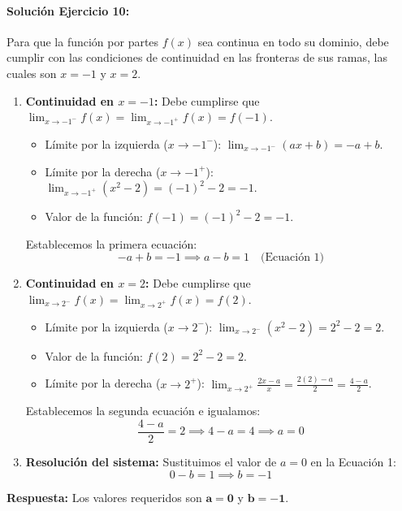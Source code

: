 \documentclass[11pt,letterpaper]{article}
\begin{document}
\paragraph{Solución Ejercicio 10:}
Para que la función por partes $f(x)$ sea continua en todo su dominio, debe cumplir con las condiciones de continuidad en las fronteras de sus ramas, las cuales son $x = -1$ y $x = 2$.
\begin{enumerate}
    \item \textbf{Continuidad en $x = -1$:} Debe cumplirse que $\lim_{x\to -1^-} f(x) = \lim_{x\to -1^+} f(x) = f(-1)$.
    \begin{itemize}
        \item Límite por la izquierda ($x \to -1^-$): $\lim_{x\to -1^-} (ax + b) = -a + b$.
        \item Límite por la derecha ($x \to -1^+$): $\lim_{x\to -1^+} (x^2 - 2) = (-1)^2 - 2 = -1$.
        \item Valor de la función: $f(-1) = (-1)^2 - 2 = -1$.
    \end{itemize}
    Establecemos la primera ecuación:
    $$-a + b = -1 \implies a - b = 1 \quad \text{(Ecuación 1)}$$
    
    \item \textbf{Continuidad en $x = 2$:} Debe cumplirse que $\lim_{x\to 2^-} f(x) = \lim_{x\to 2^+} f(x) = f(2)$.
    \begin{itemize}
        \item Límite por la izquierda ($x \to 2^-$): $\lim_{x\to 2^-} (x^2 - 2) = 2^2 - 2 = 2$.
        \item Valor de la función: $f(2) = 2^2 - 2 = 2$.
        \item Límite por la derecha ($x \to 2^+$): $\lim_{x\to 2^+} \frac{2x - a}{x} = \frac{2(2) - a}{2} = \frac{4 - a}{2}$.
    \end{itemize}
    Establecemos la segunda ecuación e igualamos:
    $$\frac{4 - a}{2} = 2 \implies 4 - a = 4 \implies a = 0$$
    
    \item \textbf{Resolución del sistema:} Sustituimos el valor de $a = 0$ en la Ecuación 1:
    $$0 - b = 1 \implies b = -1$$
\end{enumerate}
\textbf{Respuesta:} Los valores requeridos son $\mathbf{a = 0}$ y $\mathbf{b = -1}$.
\end{document}
